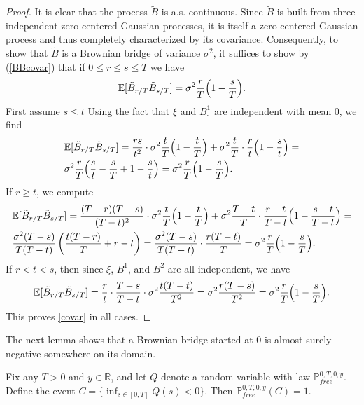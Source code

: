 \begin{proof}
	It is clear that the process $\tilde{B}$ is a.s. continuous. Since $\tilde{B}$ is built from three independent zero-centered Gaussian processes, it is itself a zero-centered Gaussian process and thus completely characterized by its covariance. Consequently, to show that $\tilde{B}$ is a Brownian bridge of variance $\sigma^2$, it suffices to show by (\ref{BBcovar}) that if $0\leq r\leq s\leq T$ we have
	\begin{equation}\label{covar}
	\mathbb{E}[\tilde{B}_{r/T}\tilde{B}_{s/T}] = \sigma^2 \frac{r}{T}\Big(1-\frac{s}{T}\Big).
	\end{equation}
	First assume $s\leq t$ Using the fact that $\xi$ and $B^1_\cdot$ are independent with mean 0, we find
	\begin{equation*}
	\begin{split}
	&\mathbb{E}[\tilde{B}_{r/T}\tilde{B}_{s/T}] = \frac{rs}{t^2}\cdot\sigma^2\frac{t}{T}\Big(1-\frac{t}{T}\Big) + \sigma^2\frac{t}{T}\cdot\frac{r}{t}\Big(1-\frac{s}{t}\Big) =\\
	&\sigma^2\frac{r}{T}\Big(\frac{s}{t} - \frac{s}{T} + 1 - \frac{s}{t}\Big) = \sigma^2\frac{r}{T}\Big(1-\frac{s}{T}\Big).
	\end{split}
	\end{equation*}
	If $r\geq t$, we compute
	\begin{equation*}
	\begin{split}
	&\mathbb{E}[\tilde{B}_{r/T}\tilde{B}_{s/T}] = \frac{(T-r)(T-s)}{(T-t)^2}\cdot\sigma^2\frac{t}{T}\Big( 1 - \frac{t}{T}\Big) + \sigma^2\frac{T-t}{T}\cdot\frac{r-t}{T-t}\Big( 1 - \frac{s-t}{T-t}\Big) =\\
	&\frac{\sigma^2(T-s)}{T(T-t)}\left(\frac{t(T-r)}{T} + r-t\right) = \frac{\sigma^2(T-s)}{T(T-t)}\cdot\frac{r(T-t)}{T} = \sigma^2\frac{r}{T}\Big(1-\frac{s}{T}\Big).
	\end{split}
	\end{equation*}
	If $r < t < s$, then since $\xi$, $B^1_\cdot$, and $B^2_\cdot$ are all independent, we have
	\[
	\mathbb{E}[\tilde{B}_{r/T}\tilde{B}_{s/T}] = \frac{r}{t}\cdot\frac{T-s}{T-t}\cdot\sigma^2\frac{t(T-t)}{T^2} = \sigma^2\frac{r(T-s)}{T^2} = \sigma^2\frac{r}{T}\Big(1-\frac{s}{T}\Big).
	\]
	This proves \eqref{covar} in all cases.
\end{proof}

The next lemma shows that a Brownian bridge started at 0 is almost surely negative somewhere on its domain.

\begin{lemma}\label{BBcross0}
	Fix any $T>0$ and $y\in\mathbb{R}$, and let $Q$ denote a random variable with law $\mathbb{P}^{0,T,0,y}_{free}$. Define the event $C = \{\inf_{s\in[0,T]} Q(s) < 0\}$. Then $\mathbb{P}^{0,T,0,y}_{free}(C) = 1$.
\end{lemma}


